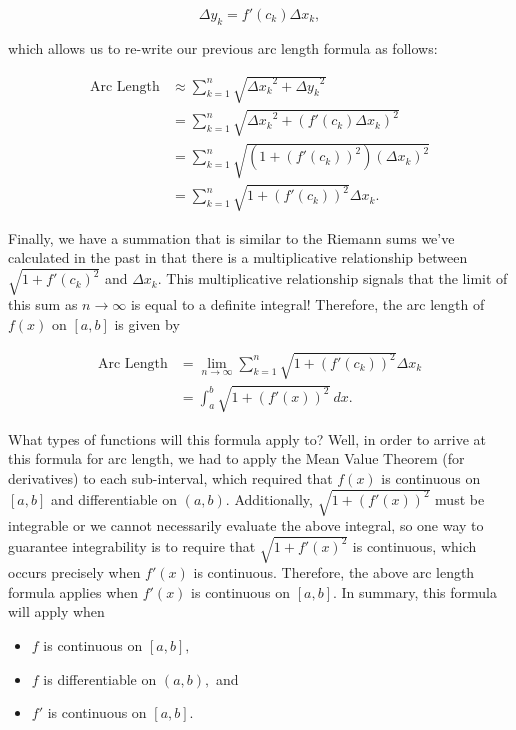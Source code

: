 \documentclass[handout,nooutcomes]{ximera}
\begin{document}
$$\Delta y_k = f'(c_k) \Delta x_k,$$

which allows us to re-write our previous arc length formula as follows:

\begin{align*}
\text{Arc Length} &\approx \displaystyle\sum_{k=1}^n \sqrt{{{\Delta x}_k}^2+{{\Delta y}_k}^2} \\
&= \displaystyle\sum_{k=1}^n \sqrt{{{\Delta x}_k}^2 + (f'(c_k) \Delta x_k)^2} \\
&= \displaystyle\sum_{k=1}^n \sqrt{(1+(f'(c_k))^2)(\Delta x _k)^2} \\
&= \displaystyle\sum_{k=1}^n \sqrt{1+(f'(c_k))^2} \Delta x _k.
\end{align*}

Finally, we have a summation that is similar to the Riemann sums we've calculated in the past in that there is a multiplicative relationship between $\sqrt{1+{f'(c_k)}^2}$ and $\Delta x _k$.  This multiplicative relationship signals that the limit of this sum as $n \to \infty$ is equal to a definite integral!  Therefore, the arc length of $f(x)$ on $[a,b]$ is given by

\begin{align*}
\text{Arc Length} &= \displaystyle\lim_{n \to \infty} \displaystyle\sum_{k=1}^n \sqrt{1+(f'(c_k))^2} \Delta x _k \\ 
&= \displaystyle\int_{a}^{b} \sqrt{1+(f'(x))^2} \ dx .
\end{align*}

What types of functions will this formula apply to?  Well, in order to arrive at this formula for arc length, we had to apply the Mean Value Theorem (for derivatives) to each sub-interval, which required that $f(x)$ is continuous on $[a,b]$ and differentiable on $(a,b).$  Additionally, $\sqrt{1+(f'(x))^2}$ must be integrable or we cannot necessarily evaluate the above integral, so one way to guarantee integrability is to require that $\sqrt{1+{f'(x)}^2}$ is continuous, which occurs precisely when $f'(x)$ is continuous.  Therefore, the above arc length formula applies when $f'(x)$ is continuous on $[a,b]$.  In summary, this formula will apply when 

\begin{itemize}

\item $f$ is continuous on $[a,b],$
\item $f$ is differentiable on $(a,b),$ and
\item $f'$ is continuous on $[a,b]$.

\end{itemize}
\end{document}
